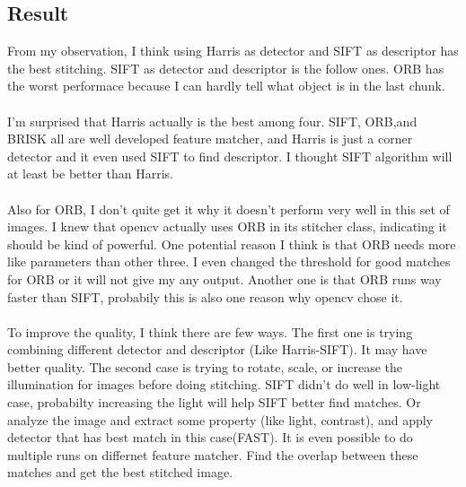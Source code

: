 \documentclass{article}
\begin{document}
\subsection*{Result}
From my observation, I think using Harris as detector and SIFT as descriptor has the best stitching.
SIFT as detector and descriptor is the follow ones. ORB has the worst performace because I can hardly tell what object is in the last chunk.\\
\\
I'm surprised that Harris actually is the best among four.
SIFT, ORB,and BRISK all are well developed feature matcher, and Harris is just a corner detector and it even used SIFT to find descriptor.
I thought SIFT algorithm will at least be better than Harris.\\
\\
Also for ORB, I don't quite get it why it doesn't perform very well in this set of images.
I knew that opencv actually uses ORB in its stitcher class, indicating it should be kind of powerful.
One potential reason I think is that ORB needs more like parameters than other three.
I even changed the threshold for good matches for ORB or it will not give my any output.
Another one is that ORB runs way faster than SIFT, probabily this is also one reason why opencv chose it.\\
\\
To improve the quality, I think there are few ways.
The first one is trying combining different detector and descriptor (Like Harris-SIFT). It may have better quality.
The second case is trying to rotate, scale, or increase the illumination for images before doing stitching.
SIFT didn't do well in low-light case, probabilty increasing the light will help SIFT better find matches.
Or analyze the image and extract some property (like light, contrast), and apply detector that has best match in this case(FAST).
It is even possible to do multiple runs on differnet feature matcher.
Find the overlap between these matches and get the best stitched image.
\end{document}
